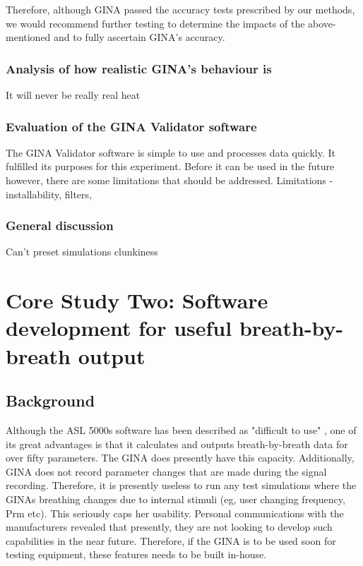 \documentclass[12pt, openany, oneside]{book}
\begin{document}
Therefore, although GINA passed the accuracy tests prescribed by our methods, we would recommend further testing to determine the impacts of the above-mentioned and to fully ascertain GINA's accuracy.


\subsection{Analysis of how realistic GINA's behaviour is}

It will never be really real
heat

\subsection{Evaluation of the GINA Validator software}
The GINA Validator software is simple to use and processes data quickly. It fulfilled its purposes for this experiment. Before it can be used in the future however, there are some limitations that should be addressed.
Limitations - installability, filters,

\subsection{General discussion}
Can't preset simulations
clunkiness
 


\chapter{Core Study Two: Software development for useful breath-by-breath output}

\section{Background}
Although the ASL 5000s software has been described as "difficult to use" \citep{thomas}, one of its great advantages is that it calculates and outputs breath-by-breath data for over fifty parameters.
The GINA does presently have this capacity. Additionally, GINA does not record parameter changes that are made during the signal recording. Therefore, it is presently useless to run any test simulations where the GINAs breathing changes due to internal stimuli (eg, user changing frequency, Prm etc). This seriously caps her usability.  Personal communications with the manufacturers revealed that presently, they are not looking to develop such capabilities in the near future. Therefore, if the GINA is to be used soon for testing equipment, these features needs to be built in-house.
\end{document}
